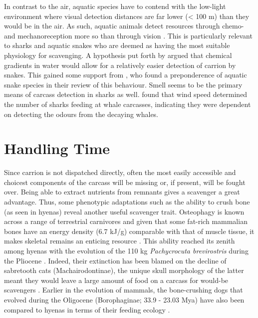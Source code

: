 \documentclass[a4paper,12pt]{article}
\begin{document}
In contrast to the air, aquatic species have to contend with the low-light environment where visual detection distances are far lower (< 100 m) than they would be in the air.
As such, aquatic animals detect resources through chemo- and mechanoreception more so than through vision \citep{ruxton2004energetic}.
This is particularly relevant to sharks and aquatic snakes who are deemed as having the most suitable physiology for scavenging.
A hypothesis put forth by \cite{sazima1990necrofagia} argued that chemical gradients in water would allow for a relatively easier detection of carrion by snakes.
This gained some support from \cite{devault2002scavenging}, who found a preponderence of aquatic snake species in their review of this behaviour.
Smell seems to be the primary means of carcass detection in sharks as well. 
\cite{fallows2013white} found that wind speed %
 determined the number of sharks feeding at whale carcasses, indicating they were dependent on detecting the odours from the decaying whales. 





\section*{Handling Time}
Since carrion is not dispatched directly, often the most easily accessible and choicest components of the carcass will be missing or, if present, will be fought over.
Being able to extract nutrients from remnants gives a scavenger a great advantage.
Thus, some phenotypic adaptations such as the ability to crush bone (as seen in hyenas) reveal another useful scavenger trait.
Osteophagy is known across a range of terrestrial carnivores and given that some fat-rich mammalian bones have an energy density (6.7 kJ/g) comparable with that of muscle tissue, it makes skeletal remains an enticing resource \citep{brown1989study}.
This ability reached its zenith among hyenas with the evolution of the 110 kg \textit{Pachycrocuta brevirostris} during the Pliocene \citep[3.6 - 2.58 Mya; ][]{palmqvist2011giant}.
Indeed, their extinction has been blamed on the decline of sabretooth cats (Machairodontinae), the unique skull morphology of the latter meant they would leave a large amount of food on a carcass for would-be scavengers \citep{palmqvist2011giant}. 
Earlier in the evolution of mammals, the bone-crushing dogs that evolved during the Oligocene (Borophaginae; 33.9 - 23.03 Mya) have also been compared to hyenas in terms of their feeding ecology \citep{van2003chapter,martin2016pursuit}.
\end{document}
